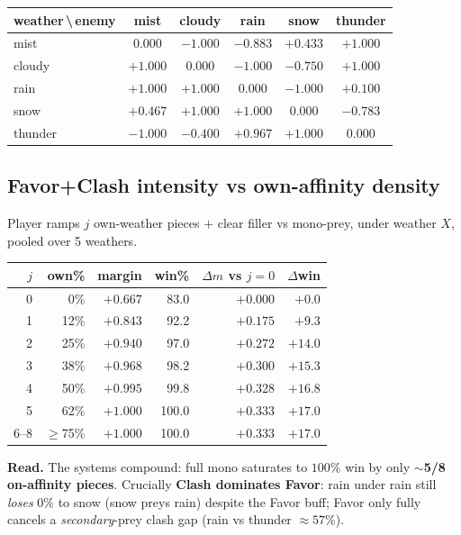 \documentclass[11pt]{article}
\newcommand{\bl}[1]{\textcolor{blue!65!black}{#1}}
\newcommand{\rd}[1]{\textcolor{red!70!black}{#1}}
\begin{document}
\begin{center}
\begin{tabular}{l|C C C C C}
\textbf{weather\,\textbackslash\,enemy} & mist & cloudy & rain & snow & thunder \\
\hline
mist    & $0.000$ & \rd{$-1.000$} & \rd{$-0.883$} & \bl{$+0.433$} & \bl{$+1.000$} \\
cloudy  & \bl{$+1.000$} & $0.000$ & \rd{$-1.000$} & \rd{$-0.750$} & \bl{$+1.000$} \\
rain    & \bl{$+1.000$} & \bl{$+1.000$} & $0.000$ & \rd{$-1.000$} & \bl{$+0.100$} \\
snow    & \bl{$+0.467$} & \bl{$+1.000$} & \bl{$+1.000$} & $0.000$ & \rd{$-0.783$} \\
thunder & \rd{$-1.000$} & \rd{$-0.400$} & \bl{$+0.967$} & \bl{$+1.000$} & $0.000$ \\
\end{tabular}
\end{center}

\subsection*{Favor+Clash intensity vs own-affinity density}

Player ramps $j$ own-weather pieces $+$ clear filler vs mono-prey, under weather $X$,
pooled over 5 weathers.

\begin{center}
\begin{tabular}{r r r r r r}
\hline
$j$ & own\% & margin & win\% & $\Delta m$ vs $j{=}0$ & $\Delta$win \\
\hline
0 &   0\% & $+0.667$ & 83.0 & $+0.000$ & $+0.0$ \\
1 &  12\% & $+0.843$ & 92.2 & $+0.175$ & $+9.3$ \\
2 &  25\% & $+0.940$ & 97.0 & $+0.272$ & $+14.0$ \\
3 &  38\% & $+0.968$ & 98.2 & $+0.300$ & $+15.3$ \\
4 &  50\% & $+0.995$ & 99.8 & $+0.328$ & $+16.8$ \\
5 &  62\% & \bl{$+1.000$} & \bl{100.0} & $+0.333$ & $+17.0$ \\
6--8 & $\geq$75\% & $+1.000$ & 100.0 & $+0.333$ & $+17.0$ \\
\hline
\end{tabular}
\end{center}

\textbf{Read.} The systems compound: full mono saturates to $100\%$ win by only
\textbf{$\sim$5/8 on-affinity pieces}. Crucially \textbf{Clash dominates Favor}:
rain under rain still \emph{loses} $0\%$ to snow (snow preys rain) despite the Favor
buff; Favor only fully cancels a \emph{secondary}-prey clash gap (rain vs thunder
$\approx 57\%$).
\end{document}
